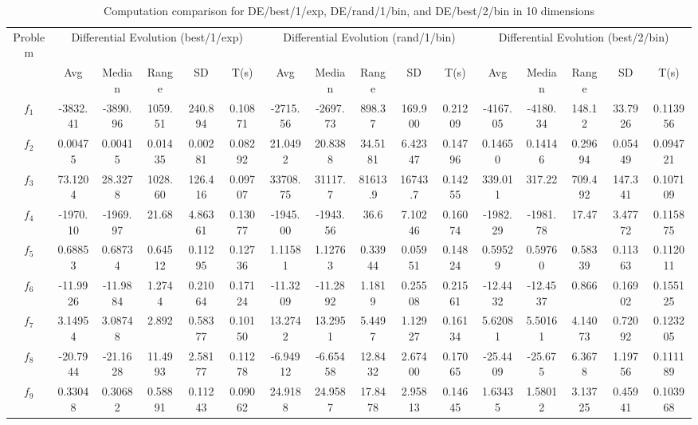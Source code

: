 \documentclass[paper=a4, fontsize=11pt]{scrartcl} %
\numberwithin{equation}{section} %
\numberwithin{figure}{section} %
\numberwithin{table}{section} %
\begin{document}
\begin{landscape}
	\begin{table}
		\tiny
		\centering
		\caption{Computation comparison for DE/best/1/exp, DE/rand/1/bin, and DE/best/2/bin in 10 dimensions}
		\label{Tab1d}
		\begin{tabular}{c|ccccc|ccccc|ccccc}
			\noalign{\smallskip}\hline\noalign{\smallskip}
			Problem & \multicolumn{5}{c}{Differential Evolution (best/1/exp)}& \multicolumn{5}{|c|}{Differential Evolution (rand/1/bin)} &  \multicolumn{5}{c}{Differential Evolution (best/2/bin)} \\ 
			\noalign{\smallskip}\hline\noalign{\smallskip}
			& Avg & Median & Range & SD & T(s) & Avg & Median
			& Range & SD & T(s) & Avg & Median & Range & SD &
			T(s) \\ 
			\noalign{\smallskip}\hline\noalign{\smallskip}
			$f_{1}$  & -3832.41 & -3890.96 & 1059.51 & 240.894 & 0.10871 & -2715.56 & -2697.73 & 898.37  & 169.900 & 0.21209 & -4167.05 & -4180.34 & 148.12  & 33.7926 & 0.113956\\
			$f_{2}$  &  0.00475 &  0.00415 & 0.01435 & 0.00281 & 0.08292 &  21.0492 &  20.8388 & 34.5181 & 6.42347 & 0.14796 &  0.14650 &  0.14146 & 0.29694 & 0.05449 & 0.094721\\
			$f_{3}$  &  73.1204 &  28.3278 & 1028.60 & 126.416 & 0.09707 & 33708.75 &  31117.7 & 81613.9 & 16743.7 & 0.14255 &  339.011 &  317.22  & 709.492 & 147.341 & 0.107109\\
			$f_{4}$  & -1970.10 & -1969.97 & 21.68   & 4.86361 & 0.13077 & -1945.00 & -1943.56 & 36.6    & 7.10246 & 0.16074 & -1982.29 & -1981.78 & 17.47   & 3.47772 & 0.115875\\
			$f_{5}$  &  0.68853 &  0.68734 & 0.64512 & 0.11295 & 0.12736 &  1.11581 &  1.12763 & 0.33944 & 0.05951 & 0.14824 &  0.59529 &  0.59760 & 0.58339 & 0.11363 & 0.112011\\
			$f_{6}$  & -11.9926 & -11.9884 & 1.2744  & 0.21064 & 0.17124 & -11.3209 & -11.2892 & 1.1819  & 0.25508 & 0.21561 & -12.4432 & -12.4537 & 0.866   & 0.16902 & 0.155125\\
			$f_{7}$  &  3.14954 &  3.08748 & 2.892   & 0.58377 & 0.10150 &  13.2742 &  13.2951 & 5.4497  & 1.12927 & 0.16134 &  5.62081 &  5.50161 & 4.14073 & 0.72092 & 0.123205\\
			$f_{8}$  & -20.7944 & -21.1628 & 11.4993 & 2.58177 & 0.11278 & -6.94912 & -6.65458 & 12.8432 & 2.67400 & 0.17065 & -25.4409 & -25.675  & 6.3678  & 1.19756 & 0.111189\\
			$f_{9}$  &  0.33048 &  0.30682 & 0.58891 & 0.11243 & 0.09062 &  24.9188 &  24.9587 & 17.8478 & 2.95813 & 0.14645 &  1.63435 &  1.58012 & 3.13725 & 0.45941 & 0.103968\\

\end{tabular}
\end{table}
\end{landscape}
\end{document}
